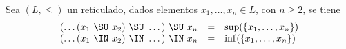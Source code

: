 
  \begin{lemma}
    \PN Sea $(L, \leq)$ un reticulado, dados elementos $x_{1}, \dotsc, x_{n} \in L$, con $n \geq 2$, se tiene
    \[
      \begin{array}{rcl}
        (\dotsc (x_{1} \ \SU \ x_{2}) \ \SU \ \dotsc) \ \SU \ x_{n} &=& \sup (\{x_{1}, \dotsc, x_{n}\}) \\
        (\dotsc (x_{1} \ \IN \ x_{2}) \ \IN \ \dotsc) \ \IN \ x_{n} &=& \inf (\{x_{1}, \dotsc, x_{n}\})
      \end{array}
    \]
  \end{lemma}
